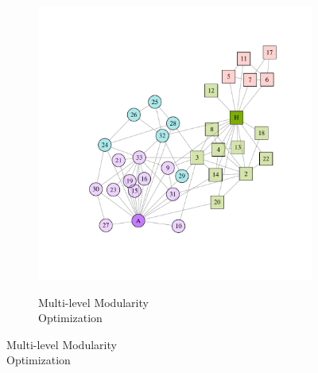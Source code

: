 \begin{figure}
\begin{subfigure}[b]{0.32\textwidth}
\label{fig:leading_eigen}
\end{subfigure}
\hfill
\begin{subfigure}[b]{0.32\textwidth}
\caption{Multi-level Modularity \\Optimization}
\includegraphics[width=\textwidth,trim={0.75in 0.75in 0.75in 0.75in}, clip=True]{louvain.pdf}
\label{fig:louvain}
\end{subfigure}


\end{figure}
